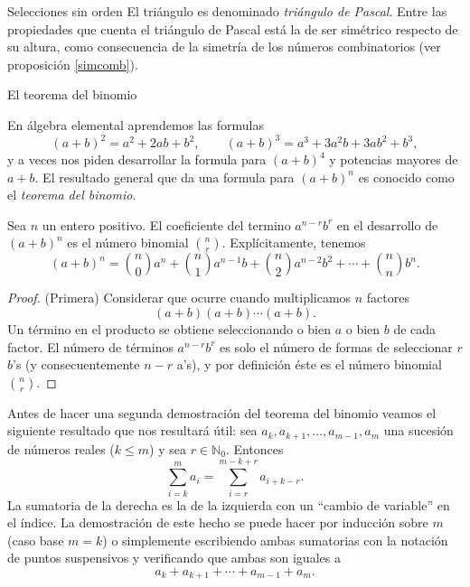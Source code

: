 \begin{section}{Selecciones sin orden}
El  triángulo es denominado \emph{triángulo de Pascal}. Entre las propiedades que cuenta el triángulo de Pascal está la de ser simétrico respecto de su altura, como consecuencia de la simetría de los números combinatorios (ver proposición \ref{simcomb}). 





\end{section}


\begin{section}{El teorema del binomio}

En álgebra elemental aprendemos las formulas
$$
(a+b)^2 = a^2 +2ab +b^2, \qquad (a+b)^3 = a^3 + 3 a^2b +3ab^2 +
b^3,
$$
y a veces nos piden desarrollar la formula para $(a+b)^4$ y
potencias mayores de $a+b$. El resultado general que da una
formula para $(a+b)^n$ es conocido como el
 {\it {teorema del binomio}}.  

\begin{teorema}\label{t3.6}
Sea $n$ un entero positivo. El coeficiente del termino
$a^{n-r}b^r$ en el desarrollo de $(a+b)^n$ es el número binomial
$\binom{n}{r}$. Explícitamente, tenemos
$$
(a+b)^n= \binom{n}{0} a^n + \binom{n}{1} a^{n-1}b+ \binom{n}{2}
a^{n-2}b^2 + \cdots + \binom{n}{n} b^n.$$
\end{teorema}
\begin{proof}(Primera) Considerar que ocurre cuando
multiplicamos $n$ factores
$$
(a+b)(a+b) \cdots (a+b).
$$
Un término en el producto se obtiene seleccionando o bien $a$ o
bien $ b$ de cada factor. El número de términos $a^{n-r}b^r$ es
solo el número de formas de seleccionar $r$ $b$'s (y
consecuentemente $n-r$ a's), y por definición éste es el número
binomial $\binom{n}{r}$.
\end{proof}

\begin{observacion}\label{cvar} Antes de hacer una segunda demostración del teorema del binomio veamos el siguiente resultado que nos resultará útil: sea $a_k,a_{k+1},\ldots,a_{m-1},a_m$ una sucesión de números reales ($k \le m$) y sea $r \in \mathbb N_0$.  Entonces
$$
\sum_{i=k}^m a_i = \sum_{i=r}^{m-k+r} a_{i+k-r}.
$$ 
La sumatoria de la derecha es la de la izquierda con un ``cambio de variable'' en el índice. La demostración de este hecho se puede hacer por inducción sobre $m$ (caso base $m=k$) o simplemente escribiendo ambas sumatorias con la notación de puntos suspensivos y verificando que ambas son iguales a
$$
a_k+a_{k+1}+\cdots+a_{m-1}+a_m.
$$  
\end{observacion}


\end{section}
